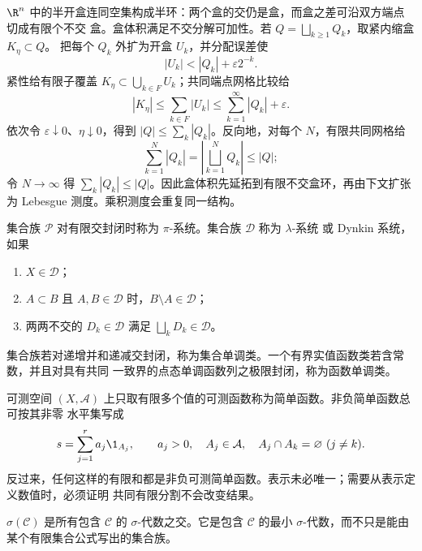 \begin{example}[半开盒的扩张数据]\label{ex:2-2-1-0}
$\R^n$ 中的半开盒连同空集构成半环：两个盒的交仍是盒，而盒之差可沿双方端点切成有限个不交
盒。盒体积满足不交分解可加性。若 $Q=\bigsqcup_{k\ge1}Q_k$，取紧内缩盒 $K_\eta\subset Q$。
把每个 $Q_k$ 外扩为开盒 $U_k$，并分配误差使
\[
 |U_k|<|Q_k|+\varepsilon2^{-k}.
\]
紧性给有限子覆盖 $K_\eta\subset\bigcup_{k\in F}U_k$；共同端点网格比较给
\[
 |K_\eta|\le\sum_{k\in F}|U_k|
 \le\sum_{k=1}^{\infty}|Q_k|+\varepsilon.
\]
依次令 $\varepsilon\downarrow0$、$\eta\downarrow0$，得到
$|Q|\le\sum_k|Q_k|$。反向地，对每个 $N$，有限共同网格给
\[
 \sum_{k=1}^N|Q_k|
 =\left|\bigsqcup_{k=1}^NQ_k\right|\le|Q|;
\]
令 $N\to\infty$ 得 $\sum_k|Q_k|\le|Q|$。因此盒体积先延拓到有限不交盒环，再由下文扩张为
Lebesgue 测度。乘积测度会重复同一结构。
\end{example}

\begin{definition}\label{def:2-2-1-1}
集合族 $\mathcal P$ 对有限交封闭时称为 $\pi$-系统。集合族 $\mathcal D$ 称为 $\lambda$-系统
或 Dynkin 系统，如果
\begin{enumerate}
 \item $X\in\mathcal D$；
 \item $A\subset B$ 且 $A,B\in\mathcal D$ 时，$B\setminus A\in\mathcal D$；
 \item 两两不交的 $D_k\in\mathcal D$ 满足 $\bigsqcup_kD_k\in\mathcal D$。
\end{enumerate}
\end{definition}

\begin{definition}[单调类]\label{def:2-2-1-2}
集合族若对递增并和递减交封闭，称为集合单调类。一个有界实值函数类若含常数，并且对具有共同
一致界的点态单调函数列之极限封闭，称为函数单调类。
\end{definition}

\begin{definition}[简单函数]\label{def:2-2-1-simple-function}
可测空间 $(X,\mathcal A)$ 上只取有限多个值的可测函数称为简单函数。非负简单函数总可按其非零
水平集写成
\[
 s=\sum_{j=1}^r a_j\1_{A_j},
 \qquad a_j>0,\quad A_j\in\mathcal A,\quad A_j\cap A_k=\varnothing\ (j\ne k).
\]
反过来，任何这样的有限和都是非负可测简单函数。表示未必唯一；需要从表示定义数值时，必须证明
共同有限分割不会改变结果。
\end{definition}

\begin{definition}[生成 $\sigma$-代数]\label{def:2-2-1-3}
$\sigma(\mathcal C)$ 是所有包含 $\mathcal C$ 的 $\sigma$-代数之交。它是包含
$\mathcal C$ 的最小 $\sigma$-代数，而不只是能由某个有限集合公式写出的集合族。
\end{definition}

